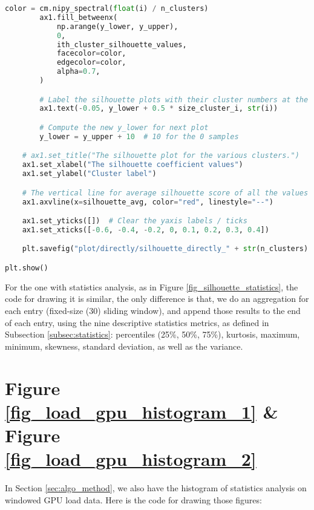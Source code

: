 \begin{lstlisting}[language=Python]
        color = cm.nipy_spectral(float(i) / n_clusters)
        ax1.fill_betweenx(
            np.arange(y_lower, y_upper),
            0,
            ith_cluster_silhouette_values,
            facecolor=color,
            edgecolor=color,
            alpha=0.7,
        )

        # Label the silhouette plots with their cluster numbers at the middle
        ax1.text(-0.05, y_lower + 0.5 * size_cluster_i, str(i))

        # Compute the new y_lower for next plot
        y_lower = y_upper + 10  # 10 for the 0 samples

    # ax1.set_title("The silhouette plot for the various clusters.")
    ax1.set_xlabel("The silhouette coefficient values")
    ax1.set_ylabel("Cluster label")

    # The vertical line for average silhouette score of all the values
    ax1.axvline(x=silhouette_avg, color="red", linestyle="--")

    ax1.set_yticks([])  # Clear the yaxis labels / ticks
    ax1.set_xticks([-0.6, -0.4, -0.2, 0, 0.1, 0.2, 0.3, 0.4])

    plt.savefig("plot/directly/silhouette_directly_" + str(n_clusters) + ".pdf", format="pdf", bbox_inches="tight")

plt.show()
\end{lstlisting}

For the one with statistics analysis, as in Figure \ref{fig_silhouette_statistics}, the code for drawing it is similar, the only difference is that, we do an aggregation for each entry (fixed-size (30) sliding window), and append those results to the end of each entry, using the nine descriptive statistics metrics, as defined in Subsection \ref{subsec:statistics}: percentiles (25\%, 50\%, 75\%), kurtosis, maximum, minimum, skewness, standard deviation, as well as the variance.

\section{Figure \ref{fig_load_gpu_histogram_1} \& Figure \ref{fig_load_gpu_histogram_2}}
In Section \ref{sec:algo_method}, we also have the histogram of statistics analysis on windowed GPU load data. Here is the code for drawing those figures:

